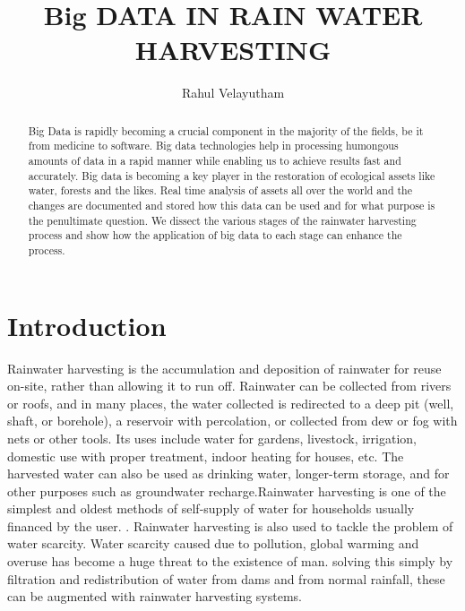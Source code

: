 \documentclass[sigconf]{acmart}
\begin{document}
\title{Big DATA IN RAIN WATER HARVESTING}


\author{Rahul Velayutham}

\renewcommand{\shortauthors}{R. Velayutham}


\begin{abstract}
Big Data is rapidly becoming a crucial component in the majority of the fields, be it from medicine to software. Big data technologies help in processing humongous amounts of data in a rapid manner while enabling us to achieve results fast and accurately. Big data is becoming a key player in the restoration of ecological assets like water, forests and the likes. Real time analysis of assets all over the world and the changes are documented and stored how this data can be used and for what purpose is the penultimate question. We dissect the various stages of the rainwater harvesting process and show how the application of big data to each stage can enhance the process.
\end{abstract}



\maketitle



\section{Introduction}

Rainwater harvesting is the accumulation and deposition of rainwater for reuse on-site, rather than allowing it to run off. Rainwater can be collected from rivers or roofs, and in many places, the water collected is redirected to a deep pit (well, shaft, or borehole), a reservoir with percolation, or collected from dew or fog with nets or other tools. Its uses include water for gardens, livestock, irrigation, domestic use with proper treatment, indoor heating for houses, etc. The harvested water can also be used as drinking water, longer-term storage, and for other purposes such as groundwater recharge.Rainwater harvesting is one of the simplest and oldest methods of self-supply of water for households usually financed by the user. \cite{Wikipedia2016}. Rainwater harvesting is also used to tackle the problem of water scarcity. Water scarcity caused due to pollution, global warming and overuse has become a huge threat to the existence of man. solving this simply by filtration and redistribution of water from dams and from normal rainfall, these can be augmented with rainwater harvesting systems. 
\end{document}
